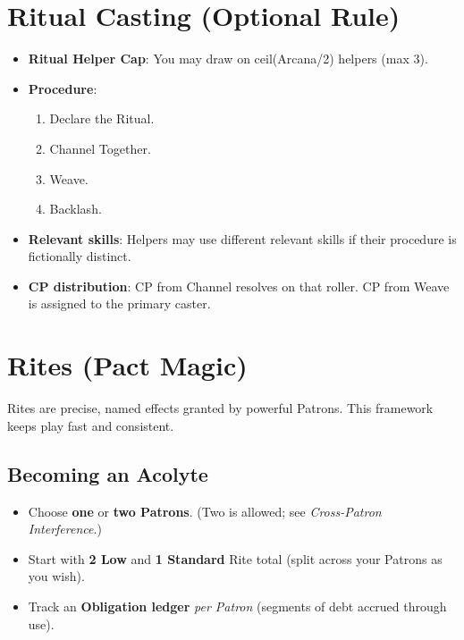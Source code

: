 \section{Ritual Casting (Optional Rule)}
\begin{itemize}
    \item \textbf{Ritual Helper Cap}: You may draw on ceil(Arcana/2) helpers (max 3).
    \item \textbf{Procedure}:
    \begin{enumerate}
        \item Declare the Ritual.
        \item Channel Together.
        \item Weave.
        \item Backlash.
    \end{enumerate}
    \item \textbf{Relevant skills}: Helpers may use different relevant skills if their procedure is fictionally distinct.
    \item \textbf{CP distribution}: CP from Channel resolves on that roller. CP from Weave is assigned to the primary caster.
\end{itemize}

\section{Rites (Pact Magic)}

Rites are precise, named effects granted by powerful Patrons. This framework keeps play fast and consistent.

\subsection{Becoming an Acolyte}
\begin{itemize}
  \item Choose \textbf{one} or \textbf{two Patrons}. (Two is allowed; see \emph{Cross-Patron Interference}.)
  \item Start with \textbf{2 Low} and \textbf{1 Standard} Rite total (split across your Patrons as you wish).
  \item Track an \textbf{Obligation ledger} \emph{per Patron} (segments of debt accrued through use).
\end{itemize}

